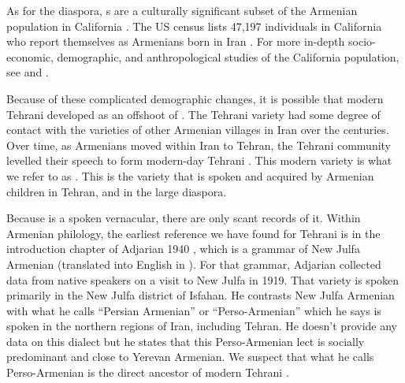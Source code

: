 As for the {\iaIA} diaspora, {\iaIA}s are a culturally significant subset of the Armenian population in California \citep{Bakalian-2017-ArmenianArmenian}.  The US census lists 47,197 individuals in California who report themselves as Armenians  born in Iran \citep{uscensusbureau:2015-foreignborn}. For more in-depth socio-economic, demographic, and anthropological studies of the California population, see \citet{DerMartirosian-2021-EconomicSocialIntegrationArmenianIranianSouthernCalifornia} and 
\citet{Fittante-2017-ButWhyGlendaleHistoryArmenian,Fittante-2018-ArmeniansGlendale,Fittante-2019-ConstructivistTheoriesPolitical}.






Because of these complicated demographic changes, it is possible that modern Tehrani {\iaIA} developed as an offshoot of {\seaSEA}. The Tehrani variety had some degree of contact with the varieties of other Armenian villages in Iran over the centuries. Over time, as Armenians moved within Iran to Tehran, the Tehrani community levelled their speech to form modern-day Tehrani {\iaIA}. This   modern variety is what we refer to as {\iaIA}. This is the variety that is spoken and acquired by Armenian children in Tehran, and in the large {\iaIA} diaspora. 

Because {\iaIA} is a spoken vernacular, there are only scant records of it. Within Armenian philology, the earliest reference we have found for Tehrani {\iaIA} is in the introduction chapter of  Adjarian 1940 \citep{Adjarian-1940-NewJulfaDialect}, which is a  grammar of New Julfa Armenian (translated into English in \citealt{Vaux-prep-NewJulfa}).  For that grammar, Adjarian collected data from native speakers on a visit to New Julfa in 1919. That variety is spoken  primarily in the New Julfa district of Isfahan. He contrasts New Julfa Armenian with what he calls ``Persian Armenian'' or ``Perso-Armenian'' which he says is spoken in the northern regions of Iran, including Tehran. He doesn't provide any data on this dialect but he states that  this Perso-Armenian lect is socially predominant  and close to Yerevan Armenian. We suspect that what he calls Perso-Armenian is the direct ancestor of modern Tehrani {\iaIA}.

